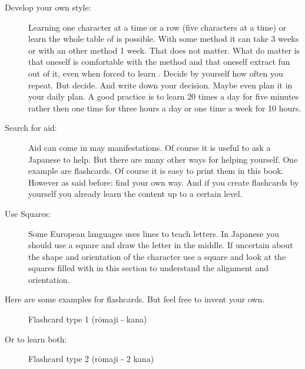 \begin{description}

\item[Develop your own style:] Learning one character at a time or a row (five
        characters at a time) or learn the whole table of \textbf{\jtopic} is
        possible. With some method it can take 3 weeks or with an other method
        1 week. That does not matter. What do matter is that oneself is
        comfortable with the method and that oneself extract fun out of it,
        even when forced to learn \textbf{\jtopic}. Decide by yourself how
        often you repeat. But decide. And write down your decision. Maybe even
        plan it in your daily plan. A good practice is to learn
        \textbf{\jtopic} 20 times a day for five minutes rather then one time
        for three hours a day or one time a week for 10 hours.

\item[Search for aid:] Aid can come in may manifestations. Of course it is
        useful to ask a Japanese to help. But there are many other ways for
        helping yourself.  One example are flashcards. Of course it is easy to
        print them in this book. However as said before: find your own way. And
        if you create flashcards by yourself you already learn the content up
        to a certain level.

\item[Use Squares:] Some European languages uses lines to teach letters. In
        Japanese you should use a square and draw the letter in the middle. If
        uncertain about the shape and orientation of the character use a square
        and look at the squares filled with \textbf{\jtopic} in this section to
        understand the alignment and orientation.

\end{description}

\newpage

Here are some examples for flashcards. But feel free to invent your own.

\begin{figure}[H]
        
        \caption{Flashcard type 1 (rōmaji - kana) }
        \label{fig:FlashCardTypeOne}
\end{figure}

\normalsize

Or to learn both:

\begin{figure}[H]
        
        \caption{Flashcard type 2 (rōmaji - 2 kana)}
        \label{fig:FlashCardTypeTwo}
\end{figure}

